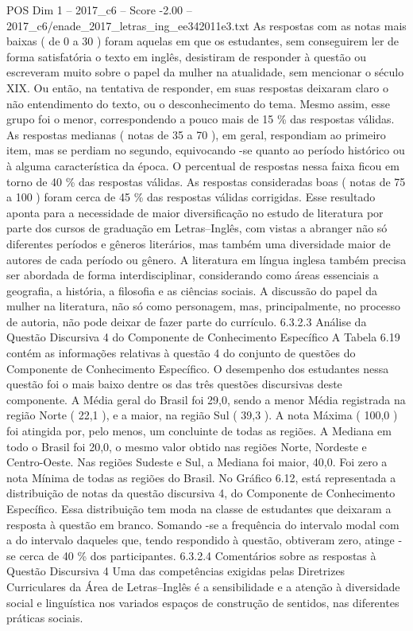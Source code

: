 \begin{textsample}{POS Dim 1 – 2017\_c6 – Score -2.00 – 2017\_c6/enade\_2017\_letras\_ing\_ee342011e3.txt}
As respostas com as notas mais baixas ( de 0 a 30 ) foram aquelas em que os estudantes, sem conseguirem ler de forma satisfatória o texto em inglês, desistiram de responder à questão ou escreveram muito sobre o papel da mulher na atualidade, sem mencionar o século XIX.
Ou então, na tentativa de responder, em suas respostas deixaram claro o não entendimento do texto, ou o desconhecimento do tema.
Mesmo assim, esse grupo foi o menor, correspondendo a pouco mais de 15 \% das respostas válidas.
As respostas medianas ( notas de 35 a 70 ), em geral, respondiam ao primeiro item, mas se perdiam no segundo, equivocando -se quanto ao período histórico ou à alguma característica da época.
O percentual de respostas nessa faixa ficou em torno de 40 \% das respostas válidas.
As respostas consideradas boas ( notas de 75 a 100 ) foram cerca de 45 \% das respostas válidas corrigidas.
Esse resultado aponta para a necessidade de maior diversificação no estudo de literatura por parte dos cursos de graduação em Letras–Inglês, com vistas a abranger não só diferentes períodos e gêneros literários, mas também uma diversidade maior de autores de cada período ou gênero.
A literatura em língua inglesa também precisa ser abordada de forma interdisciplinar, considerando como áreas essenciais a geografia, a história, a filosofia e as ciências sociais.
A discussão do papel da mulher na literatura, não só como personagem, mas, principalmente, no processo de autoria, não pode deixar de fazer parte do currículo. 6.3.2.3 Análise da Questão Discursiva 4 do Componente de Conhecimento Específico A Tabela 6.19 contém as informações relativas à questão 4 do conjunto de questões do Componente de Conhecimento Específico.
O desempenho dos estudantes nessa questão foi o mais baixo dentre os das três questões discursivas deste componente.
A Média geral do Brasil foi 29,0, sendo a menor Média registrada na região Norte ( 22,1 ), e a maior, na região Sul ( 39,3 ).
A nota Máxima ( 100,0 ) foi atingida por, pelo menos, um concluinte de todas as regiões.
A Mediana em todo o Brasil foi 20,0, o mesmo valor obtido nas regiões Norte, Nordeste e Centro-Oeste.
Nas regiões Sudeste e Sul, a Mediana foi maior, 40,0.
Foi zero a nota Mínima de todas as regiões do Brasil.
No Gráfico 6.12, está representada a distribuição de notas da questão discursiva 4, do Componente de Conhecimento Específico.
Essa distribuição tem moda na classe de estudantes que deixaram a resposta à questão em branco.
Somando -se a frequência do intervalo modal com a do intervalo daqueles que, tendo respondido à questão, obtiveram zero, atinge -se cerca de 40 \% dos participantes. 6.3.2.4 Comentários sobre as respostas à Questão Discursiva 4 Uma das competências exigidas pelas Diretrizes Curriculares da Área de Letras–Inglês é a sensibilidade e a atenção à diversidade social e linguística nos variados espaços de construção de sentidos, nas diferentes práticas sociais.

\end{textsample}
